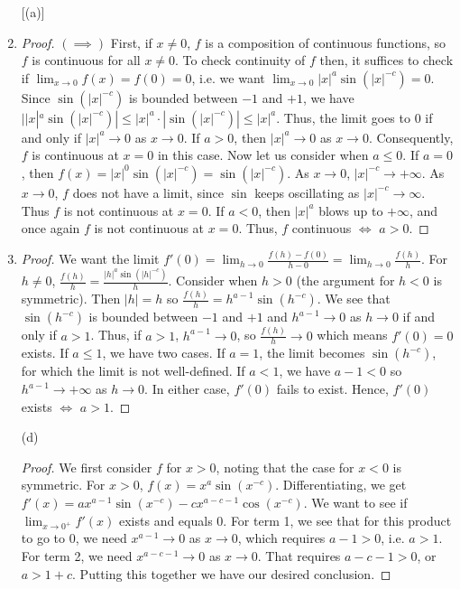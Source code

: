 \documentclass[11pt]{article}
\begin{document}
\begin{exercise}{5.13}
    \begin{enumerate} [(a)]
        \item \begin{proof}
            $(\implies)$ First, if $x \neq 0$, $f$ is a composition of continuous functions, so $f$ is continuous for all $x \neq 0$. To check continuity of $f$ then, it suffices to check if $\lim_{x \to 0} f(x) = f(0) = 0$, i.e. we want $\lim_{x \to 0} |x|^a \sin(|x|^{-c}) = 0$. Since $\sin(|x|^{-c})$ is bounded between $-1$ and $+1$, we have $||x|^a \sin(|x|^{-c})| \le |x|^a \cdot |\sin(|x|^{-c})| \le |x|^a$. Thus, the limit goes to 0 if and only if $|x|^a \to 0$ as $x \to 0$. If $a > 0$, then $|x|^a \to 0$ as $x \to 0$. Consequently, $f$ is continuous at $x = 0$ in this case. Now let us consider when $a \le 0$. If $a = 0$, then $f(x) = |x|^0 \sin(|x|^{-c}) = \sin(|x|^{-c})$. As $x \to 0$, $|x|^{-c} \to + \infty$. As $x \to 0$, $f$ does not have a limit, since $\sin$ keeps oscillating as $|x|^{-c} \to \infty$. Thus $f$ is not continuous at $x = 0$. If $a < 0$, then $|x|^a$ blows up to $+ \infty$, and once again $f$ is not continuous at $x = 0$. Thus, $f$ continuous $\iff$ $a > 0$. 
        \end{proof}
        \item \begin{proof}
            We want the limit $f'(0) = \lim_{h \to 0} \frac{f(h) - f(0)}{h - 0} = \lim_{h \to 0} \frac{f(h)}{h}$. For $h \neq 0$, $\frac{f(h)}{h} = \frac{|h|^a \sin(|h|^{-c})}{h}$. Consider when $h > 0$ (the argument for $h < 0$ is symmetric). Then $|h| = h$ so $\frac{f(h)}{h} = h^{a - 1} \sin(h^{-c})$. We see that $\sin(h^{-c})$ is bounded between $-1$ and $+1$ and $h^{a - 1} \to 0$ as $h \to 0$ if and only if $a > 1$. Thus, if $a > 1$, $h^{a - 1} \to 0$, so $\frac{f(h)}{h} \to 0$ which means $f'(0) = 0$ exists. If $a \le 1$, we have two cases. If $a = 1$, the limit becomes $\sin(h^{-c})$, for which the limit is not well-defined. If $a < 1$, we have $a - 1 < 0$ so $h^{a - 1} \to + \infty$ as $h \to 0$. In either case, $f'(0)$ fails to exist. Hence, $f'(0)$ exists $\iff$ $ a > 1$. 
        \end{proof}
        \item [(d)] \begin{proof}
            We first consider $f$ for $x > 0$, noting that the case for $ x < 0$ is symmetric. For $x > 0$, $f(x) = x^a \sin(x^{-c})$. Differentiating, we get $f'(x) = ax^{a - 1} \sin(x^{-c}) - cx^{a - c - 1} \cos(x^{-c})$. We want to see if $\lim_{x \to 0^+} f'(x)$ exists and equals $0$. For term 1, we see that for this product to go to 0, we need $x^{a - 1} \to 0$ as $x \to 0$, which requires $a - 1 > 0$, i.e. $a > 1$. For term 2, we need $x^{a - c- 1} \to 0$ as $x \to 0$. That requires $a - c- 1 > 0$, or $a > 1 + c$. Putting this together we have our desired conclusion. 
        \end{proof}
    \end{enumerate}
\end{exercise}
\end{document}
